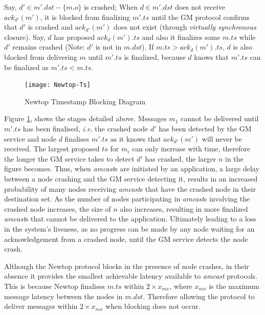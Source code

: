         Say, $d' \in m'.dst - \{m.o\}$ is crashed; When $d \in m'.dst$ does not receive $ack_{d'}(m')$, it is blocked from finalizing $m'.ts$ until the GM protocol confirms that $d'$ is crashed and $ack_{d'}(m')$ does not exist (through \emph{virtually synchronous} closure). Say, $d$ has proposed $ack_d(m').ts$ and also it finalizes some $m.ts$ while $d'$ remains crashed (Note: $d'$ is not in $m.dst$). If $m.ts > ack_d(m').ts$, $d$ is also blocked from delivering $m$ until $m'.ts$ is finalized, because $d$ knows that $m'.ts$ can be finalized as $m'.ts < m.ts$.
        
         \begin{figure}[htbp!] 
                \centering    
                \texttt{[image: Newtop-Ts]}
                \caption[Newtop Timestamp Blocking]{Newtop Timestamp Blocking Diagram}
                \label{fig:newtop-ts}
            \end{figure}

Figure \ref{fig:newtop-ts}, shows the stages detailed above.  Messages $m_1$ cannot be delivered until $m'.ts$ has been finalised, \emph{i.e.} the crashed node $d'$ has been detected by the GM service and node $d$ finalises $m'.ts$ as it knows that $ack_{d'}(m')$ will never be received.  The largest proposed $ts$ for $m_i$ can only increase with time, therefore the longer the GM service takes to detect $d'$ has crashed, the larger $n$ in the figure becomes.  Thus, when \emph{amcast}s are initiated by an application, a large delay between a node crashing and the GM service detecting it, results in an increased probability of many nodes receiving \emph{amcast}s that have the crashed node in their destination set.  As the number of nodes participating in \emph{amcast}s involving the crashed node increases, the size of $n$ also increases, resulting in more finalized \emph{amcast}s that cannot be delivered to the application. Ultimately leading to a loss in the system's liveness, as no progress can be made by any node waiting for an acknowledgement from a crashed node, until the GM service detects the node crash.  

Although the Newtop protocol blocks in the presence of node crashes, in their absence it provides the smallest achievable latency available to \emph{amcast} protocols.  This is because Newtop finalises $m.ts$ within $2 \times x_{mx}$, where $x_{mx}$ is the maximum message latency between the nodes in $m.dst$.  Therefore allowing the protocol to deliver messages within $2 \times x_{mx}$ when blocking does not occur.  

